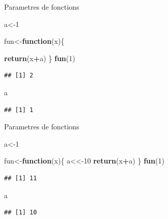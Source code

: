 \documentclass[
  ignorenonframetext,
]{beamer}
\newenvironment{Shaded}{\begin{snugshade}}{\end{snugshade}}
\newcommand{\ControlFlowTok}[1]{\textcolor[rgb]{0.13,0.29,0.53}{\textbf{#1}}}
\newcommand{\DecValTok}[1]{\textcolor[rgb]{0.00,0.00,0.81}{#1}}
\newcommand{\KeywordTok}[1]{\textcolor[rgb]{0.13,0.29,0.53}{\textbf{#1}}}
\newcommand{\NormalTok}[1]{#1}
\newcommand{\OperatorTok}[1]{\textcolor[rgb]{0.81,0.36,0.00}{\textbf{#1}}}
\begin{document}
\begin{frame}[fragile]{Parametres de fonctions}
\protect\hypertarget{parametres-de-fonctions-1}{}

\begin{Shaded}
\begin{Highlighting}[]
\NormalTok{a<-}\DecValTok{1}

\NormalTok{fun<-}\ControlFlowTok{function}\NormalTok{(x)\{}

\KeywordTok{return}\NormalTok{(x}\OperatorTok{+}\NormalTok{a)}
\NormalTok{\}}
\KeywordTok{fun}\NormalTok{(}\DecValTok{1}\NormalTok{)}
\end{Highlighting}
\end{Shaded}

\begin{verbatim}
## [1] 2
\end{verbatim}

\begin{Shaded}
\begin{Highlighting}[]
\NormalTok{a}
\end{Highlighting}
\end{Shaded}

\begin{verbatim}
## [1] 1
\end{verbatim}

\end{frame}

\begin{frame}[fragile]{Parametres de fonctions}
\protect\hypertarget{parametres-de-fonctions-2}{}

\begin{Shaded}
\begin{Highlighting}[]
\NormalTok{a<-}\DecValTok{1}

\NormalTok{fun<-}\ControlFlowTok{function}\NormalTok{(x)\{}
\NormalTok{a<<-}\DecValTok{10}
\KeywordTok{return}\NormalTok{(x}\OperatorTok{+}\NormalTok{a)}
\NormalTok{\}}
\KeywordTok{fun}\NormalTok{(}\DecValTok{1}\NormalTok{)}
\end{Highlighting}
\end{Shaded}

\begin{verbatim}
## [1] 11
\end{verbatim}

\begin{Shaded}
\begin{Highlighting}[]
\NormalTok{a}
\end{Highlighting}
\end{Shaded}

\begin{verbatim}
## [1] 10
\end{verbatim}

\end{frame}
\end{document}
